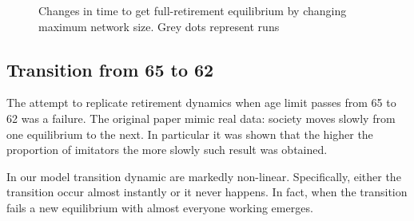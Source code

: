 \documentclass[runningheads,a4paper]{article}
\begin{document}
\begin{figure}
\centering

\caption{Changes in time to get full-retirement equilibrium by changing maximum network size. Grey dots represent runs}
\label{figure8}
\end{figure}

\subsection{Transition from 65 to 62}

The attempt to replicate retirement dynamics when age limit passes from 65 to 62 was a failure.
The original paper mimic real data: society moves slowly from one equilibrium to the next.
In particular it was shown that the higher the proportion of imitators the more slowly such result was obtained.

In our model transition dynamic are markedly non-linear.
Specifically, either the transition occur almost instantly or it never happens.
In fact, when the transition fails a new equilibrium with almost everyone working emerges.
\end{document}
